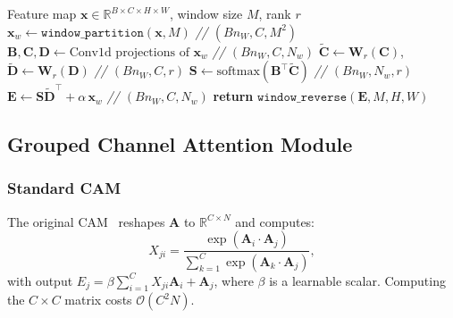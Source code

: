 \documentclass[conference]{IEEEtran}
\begin{document}
\begin{algorithm}[t]
\caption{LowRankWindowedPAM Forward Pass}
\label{alg:lrwpam}
\begin{algorithmic}[1]
\REQUIRE Feature map $\mathbf{x} \in \mathbb{R}^{B \times C \times H \times W}$, window size $M$, rank $r$
\STATE $\mathbf{x}_w \leftarrow \texttt{window\_partition}(\mathbf{x}, M)$
  \hfill \textit{\small // $(B n_W, C, M^2)$}
\STATE $\mathbf{B}, \mathbf{C}, \mathbf{D} \leftarrow \text{Conv1d projections of } \mathbf{x}_w$
  \hfill \textit{\small // $(B n_W, C, N_w)$}
\STATE $\tilde{\mathbf{C}} \leftarrow \mathbf{W}_r(\mathbf{C})$,\quad $\tilde{\mathbf{D}} \leftarrow \mathbf{W}_r(\mathbf{D})$
  \hfill \textit{\small // $(B n_W, C, r)$}
\STATE $\mathbf{S} \leftarrow \text{softmax}\!\left(\mathbf{B}^\top \tilde{\mathbf{C}}\right)$
  \hfill \textit{\small // $(B n_W, N_w, r)$}
\STATE $\mathbf{E} \leftarrow \mathbf{S} \tilde{\mathbf{D}}^\top + \alpha\, \mathbf{x}_w$
  \hfill \textit{\small // $(B n_W, C, N_w)$}
\STATE \textbf{return} $\texttt{window\_reverse}(\mathbf{E}, M, H, W)$
\end{algorithmic}
\end{algorithm}


\subsection{Grouped Channel Attention Module}

\subsubsection{Standard CAM}
The original CAM~\cite{fu2019dual} reshapes $\mathbf{A}$ to $\mathbb{R}^{C \times N}$ and computes:
\begin{equation}
  X_{ji} = \frac{\exp(\mathbf{A}_i \cdot \mathbf{A}_j)}{\sum_{k=1}^{C} \exp(\mathbf{A}_k \cdot \mathbf{A}_j)},
  \label{eq:cam_attn}
\end{equation}
with output $E_j = \beta \sum_{i=1}^{C} X_{ji} \mathbf{A}_i + \mathbf{A}_j$, where $\beta$ is a learnable scalar. Computing the $C \times C$ matrix costs $\mathcal{O}(C^2 N)$.
\end{document}
